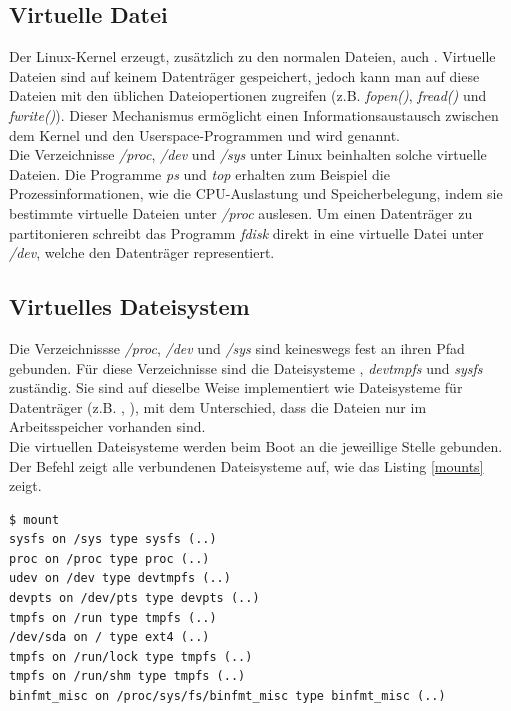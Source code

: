 \subsection{Virtuelle Datei}

Der Linux-Kernel erzeugt, zusätzlich zu den normalen Dateien, auch . Virtuelle 
Dateien sind auf keinem Datenträger gespeichert, jedoch kann man auf diese Dateien mit den üblichen Dateiopertionen
zugreifen (z.B. \emph{fopen()}, \emph{fread()} und \emph{fwrite()}). Dieser Mechanismus ermöglicht einen Informationsaustausch
zwischen dem Kernel und den Userspace-Programmen und wird  genannt. \\

Die Verzeichnisse \emph{/proc}, \emph{/dev} und \emph{/sys} unter Linux beinhalten solche virtuelle
Dateien. Die Programme \emph{ps} und \emph{top} erhalten zum Beispiel die Prozessinformationen, wie die CPU-Auslastung und Speicherbelegung, indem
sie bestimmte virtuelle Dateien unter \emph{/proc} auslesen. Um einen Datenträger zu partitonieren schreibt das Programm 
\emph{fdisk} direkt in eine virtuelle Datei unter \emph{/dev}, welche den Datenträger representiert. \\

\subsection{Virtuelles Dateisystem}

Die Verzeichnissse \emph{/proc}, \emph{/dev} und \emph{/sys} sind keineswegs fest an ihren Pfad gebunden. Für diese Verzeichnisse sind die Dateisysteme ,
\emph{devtmpfs} und \emph{sysfs} zuständig. Sie sind auf dieselbe Weise implementiert wie Dateisysteme für Datenträger (z.B. , ), mit dem Unterschied,
dass die Dateien nur im Arbeitsspeicher vorhanden sind. \\

Die virtuellen Dateisysteme werden beim Boot an die jeweillige Stelle gebunden. Der Befehl zeigt alle verbundenen Dateisysteme 
auf, wie das Listing \ref{mounts} zeigt.


\begin{lstlisting}[label=mounts,caption=mount]
$ mount
sysfs on /sys type sysfs (..)
proc on /proc type proc (..)
udev on /dev type devtmpfs (..)
devpts on /dev/pts type devpts (..)
tmpfs on /run type tmpfs (..)
/dev/sda on / type ext4 (..)
tmpfs on /run/lock type tmpfs (..)
tmpfs on /run/shm type tmpfs (..)
binfmt_misc on /proc/sys/fs/binfmt_misc type binfmt_misc (..)
\end{lstlisting}

